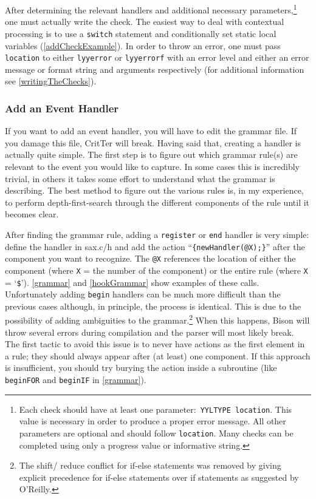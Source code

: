 \documentclass[12pt]{report}
\newcommand{\programName}{CritTer\xspace}
\begin{document}
After determining the relevant handlers and additional necessary parameters,\footnote{Each check 
should have at least one parameter:\ \lstinline{YYLTYPE location}. This value is necessary in order to 
produce a proper error message. All other parameters are optional and should follow \lstinline{location}. 
Many checks can be completed using only a progress value or informative string.} one must actually 
write the check. The easiest way to deal with contextual processing is to use a \lstinline{switch} 
statement and conditionally set static local variables (\autoref{addCheckExample}). In order to 
throw an error, one must pass \lstinline{location} to either \lstinline{lyyerror} or \lstinline{lyyerrorf} with an 
error level and either an error message or format string and arguments respectively (for additional 
information see \autoref{writingTheChecks}).

\subsubsection{Add an Event Handler}

If you want to add an event handler, you will have to edit the grammar file. If you damage this file,  
\programName will break. Having said that, creating a handler is actually quite simple. The first 
step is to figure out which grammar rule(s) are relevant to the event you would like to capture. In some 
cases this is incredibly trivial, in others it takes some effort to understand what the grammar is describing. 
The best method to figure out the various rules is, in my experience, to perform depth-first-search through 
the different components of the rule until it becomes clear. 

After finding the grammar rule, adding a \lstinline{register} or \lstinline{end} handler is very simple: 
define the handler in sax.c/h and add the action ``\lstinline!{newHandler(@X);}!'' after the component you 
want to recognize. The \lstinline{@X} references the location of either the component (where \lstinline{X} 
= the number of the component) or the entire rule (where \lstinline{X} = `\lstinline{$}'). \autoref{grammar}
 and \autoref{hookGrammar} show examples of these calls. Unfortunately adding \lstinline{begin} 
handlers can be much more difficult than the previous cases although, in principle, the process is 
identical. This is due to the possibility of adding ambiguities to the grammar.\footnote{The shift\slash 
reduce conflict for if-else statements was removed by giving explicit precedence for if-else statements 
over if statements as suggested by O'Reilly\cite[p.~188]{flex-and-bison}.} When this happens, Bison will 
throw several errors during compilation and the parser will most likely break. The first tactic to avoid this 
issue is to never have actions as the first element in a rule; they should always appear after (at least) one 
component. If this approach is insufficient, you should try burying the action inside a subroutine (like 
\lstinline{beginFOR} and \lstinline{beginIF} in \autoref{grammar}).
\end{document}
